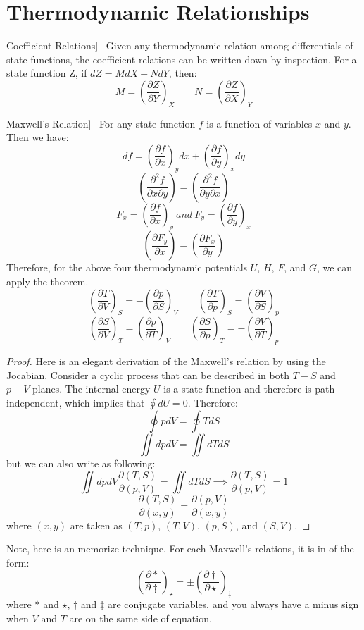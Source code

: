 \documentclass[UTF8]{book}
\newenvironment{theorem}[2][Theorem]{\begin{trivlist}
\item[\hskip \labelsep {\bfseries #1}\hskip \labelsep {\bfseries }]}{\end{trivlist}}
\begin{document}
\section{Thermodynamic Relationships}
\begin{theorem}
[Coefficient Relations]~  {Given any thermodynamic relation among differentials of state functions, the coefficient relations can be written down by inspection. For a state function Z, if $dZ=MdX+NdY$, then:}
$$M=\left( \frac{\partial Z}{\partial Y}\right)_{X}\qquad N=\left( \frac{\partial Z}{\partial X}\right)_{Y}$$
\end{theorem}
\begin{theorem}
[Maxwell's Relation]~  {For any state function $f$ is a function of variables $x$ and $y$. Then we have:}
$$df=\left(\dfrac{\partial f}{\partial x}\right)_ydx+\left(\dfrac{\partial f}{\partial y}\right)_xdy$$
$$\left(\dfrac{\partial ^2 f}{\partial x\partial y }\right)=\left(\dfrac{\partial ^2 f}{\partial y\partial x }\right)$$
$$F_x=\left(\dfrac{\partial f}{\partial x}\right)_y \ and \ F_y=\left(\dfrac{\partial f}{\partial y}\right)_x$$
$$\left(\dfrac{\partial F_y}{\partial x}\right)=\left(\dfrac{\partial F_x}{\partial y}\right)$$
 {Therefore, for the above four thermodynamic potentials $U$, $H$, $F$, and $G$, we can apply the theorem.}
$$\left(\dfrac{\partial T}{\partial V}\right)_S=-\left(\dfrac{\partial p}{\partial S}\right)_V \qquad \left(\dfrac{\partial T}{\partial p}\right)_S=\left(\dfrac{\partial V}{\partial S}\right)_p$$
$$\left(\dfrac{\partial S}{\partial V}\right)_T=\left(\dfrac{\partial p}{\partial T}\right)_V \qquad \left(\dfrac{\partial S}{\partial p}\right)_T=-\left(\dfrac{\partial V}{\partial T}\right)_p$$
\end{theorem}
\begin{proof}
 {Here is an elegant derivation of the Maxwell's relation by using the Jocabian. Consider a cyclic process that can be described in both $T-S$ and $p-V$ planes. The internal energy $U$ is a state function and therefore is path independent, which implies that $\oint dU=0$. Therefore:}
$$\oint pdV=\oint TdS$$
$$\iint dpdV=\iint dTdS$$
 {but we can also write as following:}
$$\iint dpdV\dfrac{\partial (T,S)}{\partial (p,V)}=\iint dTdS \implies \dfrac{\partial (T,S)}{\partial (p,V)}=1$$
$$\dfrac{\partial (T,S)}{\partial (x,y)}=\dfrac{\partial (p,V)}{\partial (x,y)}$$
 {where $(x,y)$ are taken as $(T,p)$, $(T,V)$, $(p,S)$, and $(S,V)$.}
\end{proof}

 {Note, here is an memorize technique. For each Maxwell's relations, it is in of the form:}
$$\left(\dfrac{\partial \ast}{\partial \ddagger}\right)_\star=\pm \left(\dfrac{\partial \dagger}{\partial \star}\right)_\ddagger$$
 {where $\ast $ and $\star$, $\dagger$ and $\ddagger$ are conjugate variables, and you always have a minus sign when $V$ and $T$ are on the same side of equation.}
\end{document}

